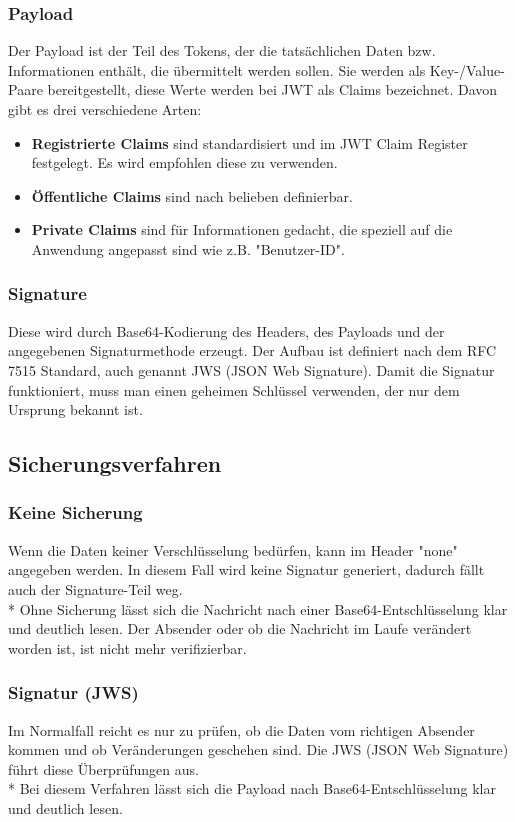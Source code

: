 \subsubsection{Payload}
Der Payload ist der Teil des Tokens, der die tatsächlichen Daten bzw. Informationen enthält, die übermittelt werden sollen.
Sie werden als Key-/Value-Paare bereitgestellt, diese Werte werden bei JWT als Claims bezeichnet. \cite{JWTIONOS}  Davon gibt es drei verschiedene Arten:
\begin{itemize}
    \item \textbf{Registrierte Claims} sind standardisiert und im JWT Claim Register festgelegt. Es wird empfohlen diese zu verwenden.
    \item \textbf{Öffentliche Claims} sind nach belieben definierbar.
    \item \textbf{Private Claims} sind für Informationen gedacht, die speziell auf die Anwendung angepasst sind wie z.B. "Benutzer-ID". \cite{JWTIONOS} 
\end{itemize}

\subsubsection{Signature}
Diese wird durch Base64-Kodierung des Headers, des Payloads und der angegebenen Signaturmethode erzeugt. Der Aufbau ist definiert nach dem RFC 7515 Standard, auch genannt JWS (JSON Web Signature).
Damit die Signatur funktioniert, muss man einen geheimen Schlüssel verwenden, der nur dem Ursprung bekannt ist. \cite{JWTIONOS} 

\subsection{Sicherungsverfahren}
\subsubsection{Keine Sicherung}
Wenn die Daten keiner Verschlüsselung bedürfen, kann im Header "none" angegeben werden. In diesem Fall wird keine Signatur generiert, dadurch fällt auch der Signature-Teil weg. \\*
Ohne Sicherung lässt sich die Nachricht nach einer Base64-Entschlüsselung klar und deutlich lesen. Der Absender oder ob die Nachricht im Laufe verändert worden ist, ist nicht mehr verifizierbar.\cite{JWTIONOS} 
\subsubsection{Signatur (JWS)}
Im Normalfall reicht es nur zu prüfen, ob die Daten vom richtigen Absender kommen und ob Veränderungen geschehen sind. Die JWS (JSON Web Signature) führt diese Überprüfungen aus. 
\\* Bei diesem Verfahren lässt sich die Payload nach Base64-Entschlüsselung klar und deutlich lesen. \cite{JWTIONOS}
